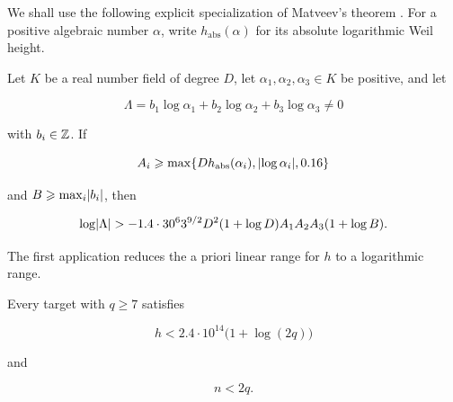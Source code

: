 We shall use the following explicit specialization of Matveev's theorem
\cite[Corollary~2.3]{Matveev2000}. For a positive algebraic number $\alpha$,
write $h_{\mathrm{abs}}(\alpha)$ for its absolute logarithmic Weil height.

\begin{lemma}
\label{lem:matveev}
Let $K$ be a real number field of degree $D$, let
$\alpha_1,\alpha_2,\alpha_3\in K$ be positive, and let

\begin{equation}
 \Lambda=b_1\log\alpha_1+b_2\log\alpha_2+b_3\log\alpha_3\ne0
\end{equation}

with $b_i\in\mathbb{Z}$. If

\begin{equation}
 A_i\geqslant
 \max\{D h_{\mathrm{abs}}(\alpha_i),\lvert\log\alpha_i\rvert,0.16\}
\end{equation}

and $B\geqslant\max_i\lvert b_i\rvert$, then

\begin{equation}
 \log\lvert\Lambda\rvert>
 -1.4\mathbin{\cdot}30^6 3^{9/2}D^2(1+\log D)
 A_1A_2A_3(1+\log B).
 \label{eq:matveev-special}
\end{equation}
\end{lemma}

The first application reduces the a priori linear range for $h$ to a
logarithmic range.

\begin{proposition}
\label{prop:h-log-bound}
Every target with $q\geqslant7$ satisfies

\begin{equation}
 h<2.4\mathbin{\cdot}10^{14}\bigl(1+\log(2q)\bigr)
 \label{eq:h-log-bound}
\end{equation}

and

\begin{equation}
 n<2q.
 \label{eq:n-less-2q}
\end{equation}
\end{proposition}

